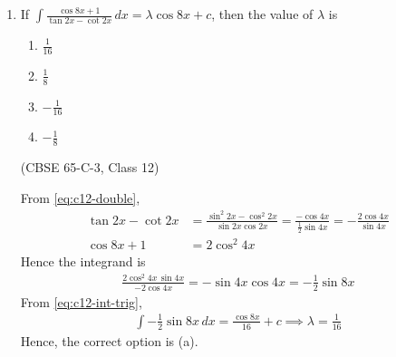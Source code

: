 \begin{enumerate}[label=\thesubsection.\arabic*., ref=\thesubsection.\theenumi]
\solution Taking $\sec$ on both sides, with $k=\sec a$ a constant,
\begin{align}
\frac{1+x}{1-y} = k \implies y = 1-\frac{1+x}{k}
\label{eq:c12-q6-exact}
\end{align}
Differentiating with respect to $x$,
\begin{align}
\frac{dy}{dx} = -\frac{1}{k} = -\frac{1-y}{1+x} = \frac{y-1}{x+1}
\end{align}
To verify numerically, take $a=1$ and the initial point $\brak{0,\,1-\frac{1}{k}}$ on
\eqref{eq:c12-q6-exact}. From \eqref{eq:c12-euler}, each option
$\frac{dy}{dx}=f\brak{x,y}$ is integrated with $h=0.01$ and compared with
\eqref{eq:c12-q6-exact}. Only
\begin{align}
f\brak{x,y} = \frac{y-1}{x+1}
\end{align}
reproduces the curve; the other options deviate from it.
Hence, the correct option is (c).
 
\begin{center}
\end{center}
 
\item If $\int \frac{\cos 8x+1}{\tan 2x-\cot 2x}\,dx = \lambda\cos 8x + c$, then the value of $\lambda$ is
\begin{enumerate}
\item $\frac{1}{16}$
\item $\frac{1}{8}$
\item $-\frac{1}{16}$
\item $-\frac{1}{8}$
\end{enumerate}
\hfill (CBSE 65-C-3, Class 12)
 
\solution From \eqref{eq:c12-double},
\begin{align}
\tan 2x-\cot 2x &= \frac{\sin^2 2x-\cos^2 2x}{\sin 2x\cos 2x}
= \frac{-\cos 4x}{\frac{1}{2}\sin 4x} = -\frac{2\cos 4x}{\sin 4x}
\\
\cos 8x+1 &= 2\cos^2 4x
\end{align}
Hence the integrand is
\begin{align}
\frac{2\cos^2 4x\,\sin 4x}{-2\cos 4x} = -\sin 4x\cos 4x = -\frac{1}{2}\sin 8x
\end{align}
From \eqref{eq:c12-int-trig},
\begin{align}
\int -\frac{1}{2}\sin 8x\,dx = \frac{\cos 8x}{16}+c
\implies \lambda = \frac{1}{16}
\end{align}
Hence, the correct option is (a).
 

\end{enumerate}
